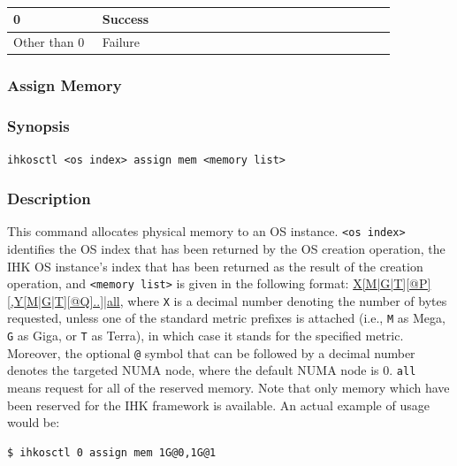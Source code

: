 \documentclass[twoside,11pt,fleqn]{book}
\newcommand\textttw[1]{\mathchardef\UrlBreakPenalty=100\mathchardef\UrlBigBreakPenalty=100\url{#1}}
\begin{document}
\subsubsection*{}
\begin{table}[!h]
\footnotesize
\begin{tabular}{|p{0.20\linewidth}|p{0.66\linewidth}|} \hline
0&Success\\ \hline
Other than 0&Failure\\ \hline
\end{tabular}
\vspace{-0em}
\end{table}
\FloatBarrier

\subsubsection{Assign Memory}
\subsubsection*{Synopsis}{\quad} \texttt{ihkosctl <os index> assign mem <memory list>}
\subsubsection*{Description}{\quad}
This command allocates physical memory to an OS instance.
\texttt{<os index>} identifies the OS index
that has been returned by the OS creation operation,
the IHK OS instance's index that has been returned as the result of the creation operation,
and \texttt{<memory list>} is given in the following format:
\textttw{X[M|G|T][@P][,Y[M|G|T][@Q]..]|all}, where \texttt{X} is a decimal number denoting
the number of bytes requested, unless one of the standard metric prefixes
is attached (i.e., \texttt{M} as Mega, \texttt{G} as Giga,
or \texttt{T} as Terra), in which case it stands for the specified metric.
Moreover, the optional \texttt{@} symbol that can be followed by a decimal number
denotes the targeted NUMA node, where the default NUMA node is 0.
\texttt{all} means request for all of the reserved memory.
Note that only memory which have been
reserved for the IHK framework is available.
An actual example of usage would be:

\begin{verbatim}
$ ihkosctl 0 assign mem 1G@0,1G@1
\end{verbatim}
\end{document}
